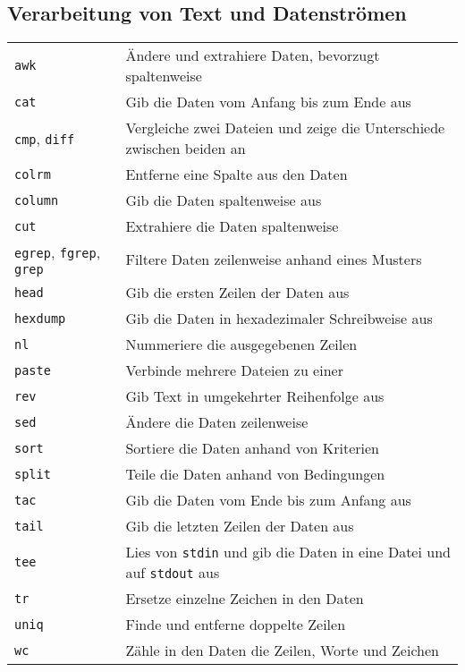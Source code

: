 \documentclass[10pt,a4paper]{article}
\begin{document}
\begin{multicols}{2}
\section{Verarbeitung von Text und Datenströmen}
\begin{tabular}{ p{2.5cm} p{8.5cm} }
  \hline
  \texttt{awk} & Ändere und extrahiere Daten, bevorzugt spaltenweise \\
  \rowcolor{Gray}
  \texttt{cat} & Gib die Daten vom Anfang bis zum Ende aus\\
  \texttt{cmp}, \texttt{diff} & Vergleiche zwei Dateien und zeige die Unterschiede zwischen beiden an\\
  \rowcolor{Gray}
  \texttt{colrm} & Entferne eine Spalte aus den Daten \\
  \texttt{column} & Gib die Daten spaltenweise aus \\
  \rowcolor{Gray}
  \texttt{cut} &  Extrahiere die Daten spaltenweise\\
  \texttt{egrep}, \texttt{fgrep}, \texttt{grep} & Filtere Daten zeilenweise anhand eines Musters\\
  \rowcolor{Gray}
  \texttt{head} & Gib die ersten Zeilen der Daten aus\\
  \texttt{hexdump} & Gib die Daten in hexadezimaler Schreibweise aus\\
  \rowcolor{Gray}
  \texttt{nl} & Nummeriere die ausgegebenen Zeilen \\
  \texttt{paste} & Verbinde mehrere Dateien zu einer \\
  \rowcolor{Gray}
  \texttt{rev} & Gib Text in umgekehrter Reihenfolge aus \\
  \texttt{sed} & Ändere die Daten zeilenweise \\
  \rowcolor{Gray}
  \texttt{sort} & Sortiere die Daten anhand von Kriterien\\
  \texttt{split} & Teile die Daten anhand von Bedingungen \\
  \rowcolor{Gray}
  \texttt{tac} & Gib die Daten vom Ende bis zum Anfang aus\\
  \texttt{tail} & Gib die letzten Zeilen der Daten aus\\
  \rowcolor{Gray}
  \texttt{tee} & Lies von \texttt{stdin} und gib die Daten in eine Datei und auf \texttt{stdout} aus\\
  \texttt{tr} & Ersetze einzelne Zeichen in den Daten\\
  \rowcolor{Gray}
  \texttt{uniq} & Finde und entferne doppelte Zeilen \\
  \texttt{wc} & Zähle in den Daten die Zeilen, Worte und Zeichen\\
  \hline
\end{tabular}


\end{multicols}
\end{document}
